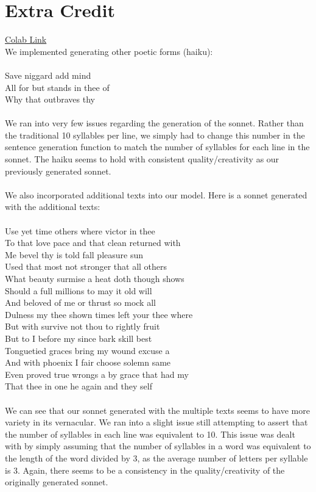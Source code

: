 \documentclass{article}
\newcommand\tab[1][1cm]{\hspace*{#1}}
\begin{document}
\newpage



\section{Extra Credit} 
\href{https://colab.research.google.com/drive/1l25ou9yO_X3g2_WjsuIXAGUL_YcAR7yZ?usp=sharing}{Colab Link}\\


We implemented generating other poetic forms (haiku): \\
\\ Save niggard add mind \\
All for but stands in thee of \\ 
Why that outbraves thy \\
\\
We ran into very few issues regarding the generation of the sonnet. Rather than the traditional 10 syllables per line, we simply had to change this number in the sentence generation function to match the number of syllables for each line in the sonnet. The haiku seems to hold with consistent quality/creativity as our previously generated sonnet. \\ 
\\
We also incorporated additional texts into our model. Here is a sonnet generated with the additional texts: \\
\\ Use yet time others where victor in thee \\
To that love pace and that clean returned with\\
Me bevel thy is told fall pleasure sun\\
Used that most not stronger that all others\\
What beauty surmise a heat doth though shows\\
Should a full millions to may it old will\\
And beloved of me or thrust so mock all\\
Dulness my thee shown times left your thee where\\
But with survive not thou to rightly fruit\\
But to I before my since bark skill best\\
Tonguetied graces bring my wound excuse a\\
And with phoenix I fair choose solemn same\\
\tab Even proved true wrongs a by grace that had my\\
\tab That thee in one he again and they self\\
\\
We can see that our sonnet generated with the multiple texts seems to have more variety in its vernacular. We ran into a slight issue still attempting to assert that the number of syllables in each line was equivalent to 10. This issue was dealt with by simply assuming that the number of syllables in a word was equivalent to the length of the word divided by 3, as the average number of letters per syllable is 3. Again, there seems to be a consistency in the quality/creativity of the originally generated sonnet.
\end{document}
